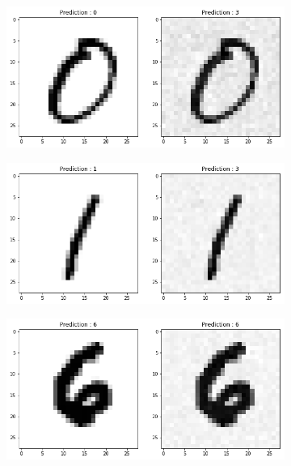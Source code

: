         \begin{figure}[htbp]
            \begin{subfigure}{.5\textwidth}
                \centering
                \includegraphics[width=\linewidth]{images/adversarial1.png}
                \caption{ }
                \label{fig:sfig1}
            \end{subfigure}
            \begin{subfigure}{.5\textwidth}
                \centering
                \includegraphics[width=\linewidth]{images/adversarial2.png}
                \caption{ }
                \label{fig:sfig2}
            \end{subfigure}
            \begin{subfigure}{.5\textwidth}
                \centering
                \includegraphics[width=\linewidth]{images/adversarial3.png}

\end{subfigure}
\end{figure}
